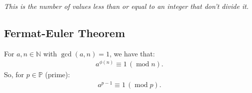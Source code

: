\documentclass[a4paper, 12pt, twoside]{article}
\DeclareMathOperator{\Mod}{mod}
\DeclareMathOperator{\Gcd}{gcd}
\begin{document}
\vspace{\baselineskip}

\textit{This is the number of values less than or equal to an integer
that don't divide it.}

\subsection{Fermat-Euler Theorem}

For $a, n \in \mathbb{N}$ with $\Gcd(a, n) = 1$, we have that:
\begin{align*}
      a^{\phi(n)} \equiv 1 \, (\Mod n).
\end{align*}
So, for $p \in \mathbb{P}$ (prime):
\begin{align*}
      a^{p - 1} \equiv 1 \, (\Mod p).
\end{align*}
\end{document}
